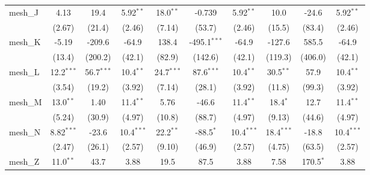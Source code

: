 \begin{tabular}{lccccccccc}
   mesh\_J                                                     & 4.13           & 19.4           & 5.92$^{**}$   & 18.0$^{**}$    & -0.739         & 5.92$^{**}$   & 10.0           & -24.6          & 5.92$^{**}$\\   
                                                               & (2.67)         & (21.4)         & (2.46)        & (7.14)         & (53.7)         & (2.46)        & (15.5)         & (83.4)         & (2.46)\\   
   mesh\_K                                                     & -5.19          & -209.6         & -64.9         & 138.4          & -495.1$^{***}$ & -64.9         & -127.6         & 585.5          & -64.9\\   
                                                               & (13.4)         & (200.2)        & (42.1)        & (82.9)         & (142.6)        & (42.1)        & (119.3)        & (406.0)        & (42.1)\\   
   mesh\_L                                                     & 12.2$^{***}$   & 56.7$^{***}$   & 10.4$^{**}$   & 24.7$^{***}$   & 87.6$^{***}$   & 10.4$^{**}$   & 30.5$^{**}$    & 57.9           & 10.4$^{**}$\\   
                                                               & (3.54)         & (19.2)         & (3.92)        & (7.14)         & (28.1)         & (3.92)        & (11.8)         & (99.3)         & (3.92)\\   
   mesh\_M                                                     & 13.0$^{**}$    & 1.40           & 11.4$^{**}$   & 5.76           & -46.6          & 11.4$^{**}$   & 18.4$^{*}$     & 12.7           & 11.4$^{**}$\\   
                                                               & (5.24)         & (30.9)         & (4.97)        & (10.8)         & (88.7)         & (4.97)        & (9.13)         & (44.6)         & (4.97)\\   
   mesh\_N                                                     & 8.82$^{***}$   & -23.6          & 10.4$^{***}$  & 22.2$^{**}$    & -88.5$^{*}$    & 10.4$^{***}$  & 18.4$^{***}$   & -18.8          & 10.4$^{***}$\\   
                                                               & (2.47)         & (26.1)         & (2.57)        & (9.10)         & (46.9)         & (2.57)        & (4.75)         & (63.5)         & (2.57)\\   
   mesh\_Z                                                     & 11.0$^{**}$    & 43.7           & 3.88          & 19.5           & 87.5           & 3.88          & 7.58           & 170.5$^{*}$    & 3.88\\   

\end{tabular}
